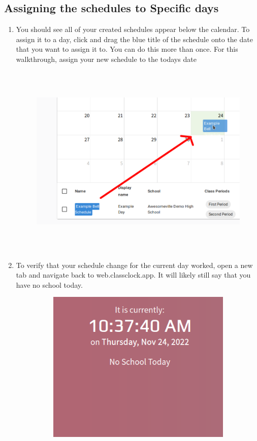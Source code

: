 \documentclass{article}
\begin{document}
\clearpage\subsection{Assigning the schedules to Specific days}
\begin{enumerate}
\item {
You should see all of your created schedules appear below the calendar. To assign it to a day, click and drag the blue
title of the schedule onto the date that you want to assign it to. You can do this more than once. For this
walkthrough, assign your new schedule to the todays date\newline
}
\begin{figure}
\includegraphics[width=6.5in,height=3.6807in]{Mini20Manual-img012.png}\end{figure}
\item {
To verify that your schedule change for the current day worked, open a new tab and navigate back to web.classclock.app.
It will likely still say that you have no school today.}
\begin{figure}
\includegraphics[width=4.4366in,height=2.8764in]{Mini20Manual-img013.png}\end{figure}

\end{enumerate}
\end{document}
